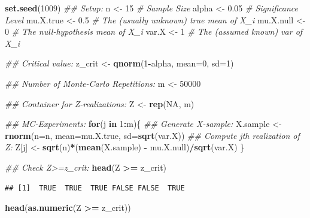 \documentclass[]{book}
\newenvironment{Shaded}{\begin{snugshade}}{\end{snugshade}}
\newcommand{\CommentTok}[1]{\textcolor[rgb]{0.56,0.35,0.01}{\textit{#1}}}
\newcommand{\ControlFlowTok}[1]{\textcolor[rgb]{0.13,0.29,0.53}{\textbf{#1}}}
\newcommand{\DataTypeTok}[1]{\textcolor[rgb]{0.13,0.29,0.53}{#1}}
\newcommand{\DecValTok}[1]{\textcolor[rgb]{0.00,0.00,0.81}{#1}}
\newcommand{\FloatTok}[1]{\textcolor[rgb]{0.00,0.00,0.81}{#1}}
\newcommand{\KeywordTok}[1]{\textcolor[rgb]{0.13,0.29,0.53}{\textbf{#1}}}
\newcommand{\NormalTok}[1]{#1}
\newcommand{\OperatorTok}[1]{\textcolor[rgb]{0.81,0.36,0.00}{\textbf{#1}}}
\newcommand{\OtherTok}[1]{\textcolor[rgb]{0.56,0.35,0.01}{#1}}
\newcommand{\StringTok}[1]{\textcolor[rgb]{0.31,0.60,0.02}{#1}}
\theoremstyle{definition}
\theoremstyle{definition}
\theoremstyle{definition}
\theoremstyle{remark}
\begin{document}
\begin{Shaded}
\begin{Highlighting}[]
\KeywordTok{set.seed}\NormalTok{(}\DecValTok{1009}\NormalTok{)}
\CommentTok{## Setup:}
\NormalTok{n         <-}\StringTok{ }\DecValTok{15}    \CommentTok{# Sample Size}
\NormalTok{alpha     <-}\StringTok{  }\FloatTok{0.05} \CommentTok{# Significance Level}
\NormalTok{mu.X.true <-}\StringTok{  }\FloatTok{0.5}  \CommentTok{# The (usually unknown) true mean of X_i}
\NormalTok{mu.X.null <-}\StringTok{  }\DecValTok{0}    \CommentTok{# The null-hypothesis mean of X_i}
\NormalTok{var.X     <-}\StringTok{  }\DecValTok{1}    \CommentTok{# The (assumed known)  var of X_i}

\CommentTok{## Critical value:}
\NormalTok{z_crit <-}\StringTok{ }\KeywordTok{qnorm}\NormalTok{(}\DecValTok{1}\OperatorTok{-}\NormalTok{alpha, }\DataTypeTok{mean=}\DecValTok{0}\NormalTok{, }\DataTypeTok{sd=}\DecValTok{1}\NormalTok{)}

\CommentTok{## Number of Monte-Carlo Repetitions:}
\NormalTok{m         <-}\StringTok{ }\DecValTok{50000}

\CommentTok{## Container for Z-realizations:}
\NormalTok{Z         <-}\StringTok{ }\KeywordTok{rep}\NormalTok{(}\OtherTok{NA}\NormalTok{, m)}

\CommentTok{## MC-Experiments:}
\ControlFlowTok{for}\NormalTok{(j }\ControlFlowTok{in} \DecValTok{1}\OperatorTok{:}\NormalTok{m)\{}
  \CommentTok{## Generate X-sample:}
\NormalTok{  X.sample <-}\StringTok{ }\KeywordTok{rnorm}\NormalTok{(}\DataTypeTok{n=}\NormalTok{n, }\DataTypeTok{mean=}\NormalTok{mu.X.true, }\DataTypeTok{sd=}\KeywordTok{sqrt}\NormalTok{(var.X))}
  \CommentTok{## Compute jth realization of Z:}
\NormalTok{  Z[j]     <-}\StringTok{ }\KeywordTok{sqrt}\NormalTok{(n)}\OperatorTok{*}\NormalTok{(}\KeywordTok{mean}\NormalTok{(X.sample) }\OperatorTok{-}\StringTok{ }\NormalTok{mu.X.null)}\OperatorTok{/}\KeywordTok{sqrt}\NormalTok{(var.X)}
\NormalTok{\}}

\CommentTok{## Check Z>=z_crit:}
\KeywordTok{head}\NormalTok{(Z }\OperatorTok{>=}\StringTok{ }\NormalTok{z_crit)}
\end{Highlighting}
\end{Shaded}

\begin{verbatim}
## [1]  TRUE  TRUE  TRUE FALSE FALSE  TRUE
\end{verbatim}

\begin{Shaded}
\begin{Highlighting}[]
\KeywordTok{head}\NormalTok{(}\KeywordTok{as.numeric}\NormalTok{(Z }\OperatorTok{>=}\StringTok{ }\NormalTok{z_crit))}
\end{Highlighting}
\end{Shaded}
\end{document}
